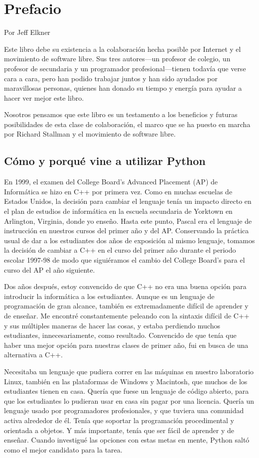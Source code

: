 \chapter{Prefacio}

Por Jeff Elkner

Este libro debe su existencia a la colaboración hecha posible por
Internet y el movimiento de software libre. Sus tres autores—un profesor
de colegio, un profesor de secundaria y un programador profesional—tienen
todavía que verse cara a cara, pero han podido trabajar juntos y han
sido ayudados por maravillosas personas, quienes han donado su tiempo
y energía para ayudar a hacer ver mejor este libro.

Nosotros pensamos que este libro es un testamento a los beneficios
y futuras posibilidades de esta clase de colaboración, el marco que
se ha puesto en marcha por Richard Stallman y el movimiento de software
libre.

\section*{Cómo y porqué vine a utilizar Python}

En 1999, el examen del College Board's Advanced Placement (AP) de
Informática se hizo en C++ por primera vez. Como en muchas escuelas
de Estados Unidos, la decisión para cambiar el lenguaje tenía un impacto
directo en el plan de estudios de informática en la escuela secundaria
de Yorktown en Arlington, Virginia, donde yo enseño. Hasta este punto,
Pascal era el lenguaje de instrucción en nuestros cursos del primer
año y del AP. Conservando la práctica usual de dar a los estudiantes
dos años de exposición al mismo lenguaje, tomamos la decisión de cambiar
a C++ en el curso del primer año durante el periodo escolar 1997-98
de modo que siguiéramos el cambio del College Board's para el curso
del AP el año siguiente.

Dos años después, estoy convencido de que C++ no era una buena opción
para introducir la informática a los estudiantes. Aunque es un lenguaje
de programación de gran alcance, también es extremadamente difícil
de aprender y de enseñar. Me encontré constantemente peleando con
la sintaxis difícil de C++ y sus múltiples maneras de hacer las cosas,
y estaba perdiendo muchos estudiantes, innecesariamente, como resultado.
Convencido de que tenía que haber una mejor opción para nuestras clases
de primer año, fui en busca de una alternativa a C++.

Necesitaba un lenguaje que pudiera correr en las máquinas en nuestro
laboratorio Linux, también en las plataformas de Windows y Macintosh,
que muchos de los estudiantes tienen en casa. Quería que fuese un
lenguaje de código abierto, para que los estudiantes lo pudieran usar
en casa sin pagar por una licencia. Quería un lenguaje usado por programadores
profesionales, y que tuviera una comunidad activa alrededor de él.
Tenía que soportar la programación procedimental y orientada a objetos.
Y más importante, tenía que ser fácil de aprender y de enseñar. Cuando
investigué las opciones con estas metas en mente, Python saltó como
el mejor candidato para la tarea.

